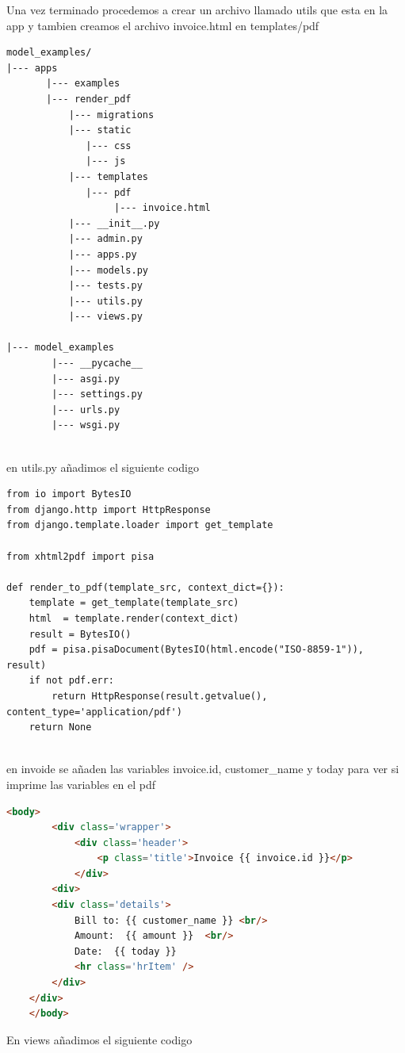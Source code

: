 \documentclass{article}
\begin{document}
Una vez terminado procedemos a crear un archivo llamado utils que esta en la app y tambien creamos el archivo invoice.html en templates/pdf

\begin{lstlisting}[style=ascii-tree]
model_examples/
|--- apps
       |--- examples
       |--- render_pdf
           |--- migrations
           |--- static
              |--- css
              |--- js
           |--- templates
              |--- pdf
                   |--- invoice.html
           |--- __init__.py
           |--- admin.py
           |--- apps.py
           |--- models.py
           |--- tests.py
           |--- utils.py
           |--- views.py
           
|--- model_examples
        |--- __pycache__
        |--- asgi.py
        |--- settings.py
        |--- urls.py
        |--- wsgi.py
        
\end{lstlisting}

en utils.py añadimos el siguiente codigo

\begin{lstlisting}[laguage=Python]
from io import BytesIO
from django.http import HttpResponse
from django.template.loader import get_template

from xhtml2pdf import pisa

def render_to_pdf(template_src, context_dict={}):
    template = get_template(template_src)
    html  = template.render(context_dict)
    result = BytesIO()
    pdf = pisa.pisaDocument(BytesIO(html.encode("ISO-8859-1")), result)
    if not pdf.err:
        return HttpResponse(result.getvalue(), content_type='application/pdf')
    return None
    
\end{lstlisting}

en invoide se añaden las variables invoice.id, customer_name y today para ver si imprime las variables en el pdf

\begin{lstlisting}[language=HTML]
    <body>
        <div class='wrapper'>
            <div class='header'>
                <p class='title'>Invoice {{ invoice.id }}</p>
            </div>
        <div>
        <div class='details'>
            Bill to: {{ customer_name }} <br/>
            Amount:  {{ amount }}  <br/>
            Date:  {{ today }} 
            <hr class='hrItem' />
        </div>
    </div>
    </body>
\end{lstlisting}

En views añadimos el siguiente codigo
\end{document}
